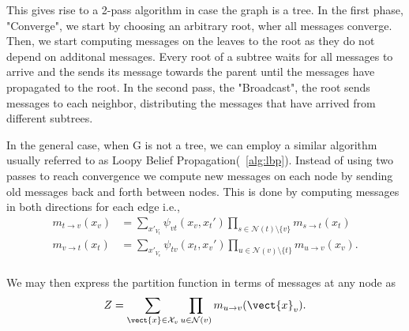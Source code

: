 This gives rise to a 2-pass algorithm in case the graph is a tree.
In the first phase, "Converge", we start by choosing an arbitrary root, wher all messages converge.
Then, we start computing messages on the leaves \wrt to the root as they do not depend on additonal messages.
Every root of a subtree waits for all messages to arrive and the sends its message towards the parent until the messages have propagated to the root.
In the second pass, the "Broadcast", the root sends messages to each neighbor, distributing the messages that have arrived from different subtrees.

In the general case, when G is not a tree, we can employ a similar algorithm usually referred to as Loopy Belief Propagation(\alg~\ref{alg:lbp}).
Instead of using two passes to reach convergence we compute new messages on each node by sending  old messages back and forth between nodes.
This is done by computing messages in both directions for each edge i.e., 
\begin{equation}
    \begin{split}
        \label{eq:mespas}
        m_{t \rightarrow v}(x_v) &= \sum_{x'_{V_t}} \psi_{vt}(x_v, x_t') \prod_{s\in \mathcal{N}(t) \setminus \{v\}} m_{s \rightarrow t}(x_t) \\
        m_{v \rightarrow t}(x_t) &= \sum_{x'_{V_v}} \psi_{tv}(x_t, x_v') \prod_{u\in \mathcal{N}(v) \setminus \{t\}} m_{u \rightarrow v}(x_v). \\
    \end{split}
\end{equation}

We may then express the partition function in terms of messages\cite{piatkowski2018exponential} at any node as 
\begin{equation}
    Z = \sum_{\vect{x} \in \mathcal{X}_v} \prod_{u \in \mathcal{N}(v)} m_{u \rightarrow v}(\vect{x}_v).
\end{equation} 


